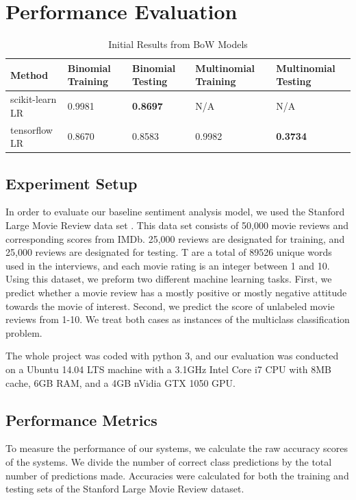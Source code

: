 \documentclass[conference]{IEEEtran}
\begin{document}
\section{Performance Evaluation}
\label{performance}
    \begin{table}[]
        \centering
        \caption{Initial Results from BoW Models}
        \label{my-label}
        \begin{tabularx}{\textwidth}{ X  X  X X  X }
        \toprule
        Method & Binomial Training & Binomial Testing & Multinomial Training & Multinomial Testing \\
        \midrule
        scikit-learn LR & 0.9981 & \textbf{0.8697} & N/A & N/A \\
        tensorflow LR & 0.8670 & 0.8583 & 0.9982 & \textbf{0.3734} \\
        \bottomrule
        \end{tabularx}
    \end{table}
\subsection{Experiment Setup}
    In order to evaluate our baseline sentiment analysis model, we used the
    Stanford Large Movie Review data set \cite{maas2011learning}. This data
    set consists of 50,000 movie reviews and corresponding scores from IMDb.
    25,000 reviews are designated for training, and 25,000 reviews are designated for testing.
    T are a total of 89526 unique words used in the interviews, and each
    movie rating is an integer between 1 and 10. Using this dataset, we preform
    two different machine learning tasks. First, we predict whether a movie review
    has a mostly positive or mostly negative attitude towards the movie of interest. 
    Second, we predict the score of unlabeled movie reviews from 1-10. We treat
    both cases as instances of the multiclass classification problem.
    
    The whole project was coded with python 3, and our evaluation was conducted on
    a Ubuntu 14.04 LTS machine with a 3.1GHz Intel Core i7 CPU with 8MB cache,
    6GB RAM, and a 4GB nVidia GTX 1050 GPU.
    
\subsection{Performance Metrics}
    To measure the performance of our systems, we calculate the raw accuracy
    scores of the systems. We divide the number of correct class predictions
    by the total number of predictions made. Accuracies were calculated
    for both the training and testing sets of the Stanford Large Movie Review dataset.
    
\end{document}
